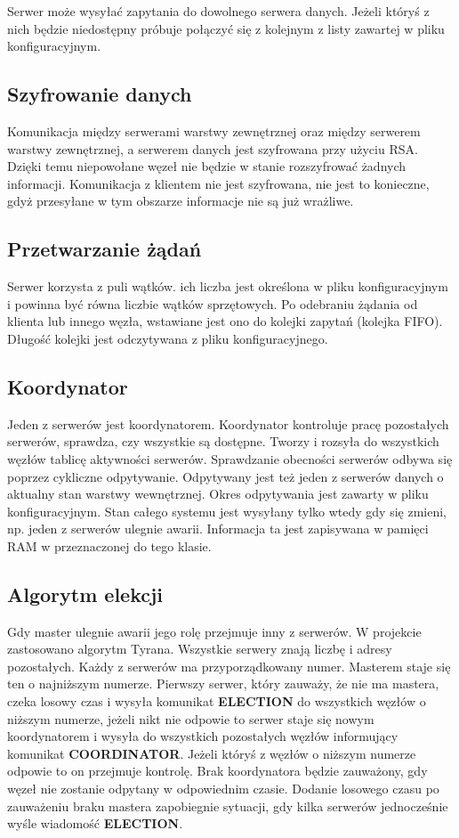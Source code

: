 Serwer może wysyłać zapytania do dowolnego serwera danych. Jeżeli któryś z nich będzie niedostępny próbuje połączyć się z kolejnym z listy zawartej w pliku konfiguracyjnym.

\subsection{Szyfrowanie danych}
Komunikacja między serwerami warstwy zewnętrznej oraz między serwerem warstwy zewnętrznej, a serwerem danych jest szyfrowana przy użyciu RSA. Dzięki temu niepowołane węzeł nie będzie w stanie rozszyfrować żadnych informacji. Komunikacja z klientem nie jest szyfrowana, nie jest to konieczne, gdyż przesyłane w tym obszarze informacje nie są już wrażliwe.

\subsection{Przetwarzanie żądań}
Serwer korzysta z puli wątków. ich liczba jest określona w pliku konfiguracyjnym i powinna być równa liczbie wątków sprzętowych. Po odebraniu żądania od klienta lub innego węzła, wstawiane jest ono do kolejki zapytań (kolejka FIFO). Długość kolejki jest odczytywana z pliku konfiguracyjnego.

\subsection{Koordynator}
Jeden z serwerów jest koordynatorem. Koordynator kontroluje pracę pozostałych serwerów, sprawdza, czy wszystkie są dostępne. Tworzy i rozsyła do wszystkich węzłów tablicę aktywności serwerów. Sprawdzanie obecności serwerów odbywa się poprzez cykliczne odpytywanie. Odpytywany jest też jeden z serwerów danych o aktualny stan warstwy wewnętrznej. Okres odpytywania jest zawarty w pliku konfiguracyjnym. Stan całego systemu jest wysyłany tylko wtedy gdy się zmieni, np. jeden z serwerów ulegnie awarii. Informacja ta jest zapisywana w pamięci RAM w przeznaczonej do tego klasie.

\subsection{Algorytm elekcji}
Gdy master ulegnie awarii jego rolę przejmuje inny z serwerów. W projekcie zastosowano algorytm Tyrana.
Wszystkie serwery znają liczbę i adresy pozostałych. Każdy z serwerów ma przyporządkowany numer. Masterem staje się ten o najniższym numerze. Pierwszy serwer, który zauważy, że nie ma mastera, czeka losowy czas i wysyła komunikat \textbf{ELECTION} do wszystkich węzłów o niższym numerze, jeżeli nikt nie odpowie to serwer staje się nowym koordynatorem i wysyła do wszystkich pozostałych węzłów informujący komunikat \textbf{COORDINATOR}. Jeżeli któryś z węzłów o niższym numerze odpowie to on przejmuje kontrolę. Brak koordynatora będzie zauważony, gdy węzeł nie zostanie odpytany w odpowiednim czasie. Dodanie losowego czasu po zauważeniu braku mastera zapobiegnie sytuacji, gdy kilka serwerów jednocześnie wyśle wiadomość \textbf{ELECTION}.

